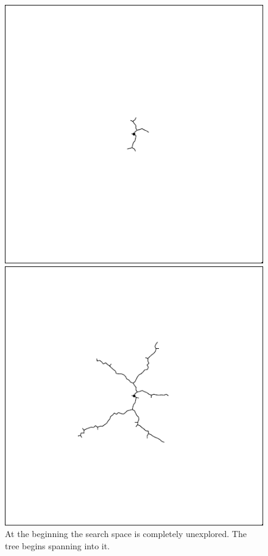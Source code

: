 \documentclass[conference]{IEEEtran}
\begin{document}
\begin{figure}[h]
\centering
\begin{minipage}[t]{0.3\linewidth}
\centering
\includegraphics[width=1\textwidth]{images/RRT/01.png}
\caption{At the beginning the search space is completely unexplored. The tree begins spanning into it.}
\end{minipage}
\hfill
\begin{minipage}[t]{0.3\linewidth}
\centering
\includegraphics[width=1\textwidth]{images/RRT/02.png}

\end{minipage}
\end{figure}
\end{document}
